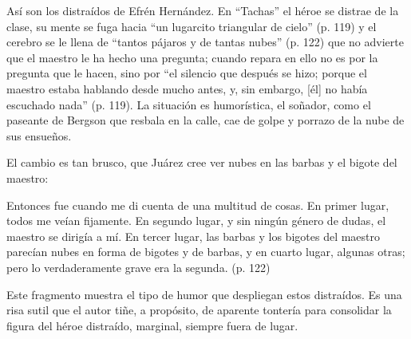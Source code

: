 \documentclass[14pt,twoside,final]{extbook} %
\begin{document}
Así son los distraídos de Efrén Hernández. En ``Tachas'' el héroe se distrae de la clase, su mente se fuga hacia ``un lugarcito triangular de cielo” (p. 119) y el cerebro se le llena de ``tantos pájaros y de tantas nubes'' (p. 122) que no advierte que el maestro le ha hecho una pregunta; cuando repara en ello no es por la pregunta que le hacen, sino por ``el silencio que después se hizo; porque el maestro estaba hablando desde mucho antes, y, sin embargo, [él] no había escuchado nada'' (p. 119). La situación es humorística, el soñador, como el paseante de Bergson que resbala en la calle, cae de golpe y porrazo de la nube de sus ensueños.

El cambio es tan brusco, que Juárez cree ver nubes en las barbas y el bigote del maestro:
\begin{quoting}
Entonces fue cuando me di cuenta de una multitud de cosas. En primer lugar, todos me veían fijamente. En segundo lugar, y sin ningún género de dudas, el maestro se dirigía a mí. En tercer lugar, las barbas y los bigotes del maestro parecían nubes en forma de bigotes y de barbas, y en cuarto lugar, algunas otras; pero lo verdaderamente grave era la segunda. (p. 122)
\end{quoting}
Este fragmento muestra el tipo de humor que despliegan estos distraídos. Es una risa sutil que el autor tiñe, a propósito, de aparente tontería para consolidar la figura del héroe distraído, marginal, siempre fuera de lugar.
\end{document}
